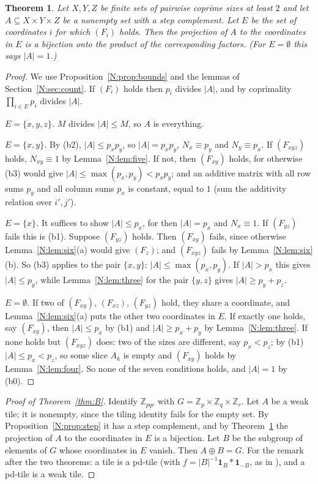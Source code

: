\documentclass[11pt,a4paper]{amsart}
\newtheorem{theorem}{Theorem}
\theoremstyle{definition}
\theoremstyle{remark}
\newcommand{\Z}{\mathbb{Z}}
\newcommand{\one}{\mathbf{1}}
\begin{document}
\begin{theorem}\label{N:thm:structure}
Let $X,Y,Z$ be finite sets of pairwise coprime sizes at least $2$ and let $A\subseteq X\times Y\times Z$ be a
nonempty set with a step complement. Let $E$ be the set of coordinates $i$ for which $(F_i)$ holds. Then the
projection of $A$ to the coordinates in $E$ is a bijection onto the product of the corresponding factors. (For
$E=\emptyset$ this says $|A|=1$.)
\end{theorem}
\begin{proof}
We use Proposition~\ref{N:prop:bounds} and the lemmas of Section~\ref{N:sec:count}. If $(F_i)$ holds then $p_i$
divides $|A|$, and by coprimality $\prod_{i\in E}p_i$ divides $|A|$.

\emph{$E=\{x,y,z\}$.} $M$ divides $|A|\le M$, so $A$ is everything.

\emph{$E=\{x,y\}$.} By (b2), $|A|\le p_xp_y$, so $|A|=p_xp_y$, $N_x\equiv p_y$ and $N_y\equiv p_x$. If $(F_{xyz})$
holds, $N_{xy}\equiv1$ by Lemma~\ref{N:lem:five}. If not, then $(F_{xy})$ holds, for otherwise (b3) would give
$|A|\le\max(p_x,p_y)<p_xp_y$; and an additive matrix with all row sums $p_y$ and all column sums $p_x$ is
constant, equal to $1$ (sum the additivity relation over $i',j'$).

\emph{$E=\{x\}$.} It suffices to show $|A|\le p_x$, for then $|A|=p_x$ and $N_x\equiv 1$. If $(F_{yz})$ fails this
is (b1). Suppose $(F_{yz})$ holds. Then $(F_{xy})$ fails, since otherwise Lemma~\ref{N:lem:six}(a) would give
$(F_z)$; and $(F_{xyz})$ fails by Lemma~\ref{N:lem:six}(b). So (b3) applies to the pair $\{x,y\}$:
$|A|\le\max(p_x,p_y)$. If $|A|>p_x$ this gives $|A|\le p_y$, while Lemma~\ref{N:lem:three} for the pair $\{y,z\}$
gives $|A|\ge p_y+p_z$.

\emph{$E=\emptyset$.} If two of $(F_{xy})$, $(F_{xz})$, $(F_{yz})$ hold, they share a coordinate, and
Lemma~\ref{N:lem:six}(a) puts the other two coordinates in $E$. If exactly one holds, say $(F_{xy})$, then
$|A|\le p_x$ by (b1) and $|A|\ge p_x+p_y$ by Lemma~\ref{N:lem:three}. If none holds but $(F_{xyz})$ does: two of
the sizes are different, say $p_x<p_z$; by (b1) $|A|\le p_x<p_z$, so some slice $A_k$ is empty and $(F_{xy})$
holds by Lemma~\ref{N:lem:four}. So none of the seven conditions holds, and $|A|=1$ by (b0).
\end{proof}

\begin{proof}[Proof of Theorem~\ref{thm:B}]
Identify $\Z_{pqr}$ with $G=\Z_p\times\Z_q\times\Z_r$. Let $A$ be a weak tile; it is nonempty, since the
tiling identity fails for the empty set. By Proposition~\ref{N:prop:step} it has a step complement, and by
Theorem~\ref{N:thm:structure} the projection of $A$ to the coordinates in $E$ is a bijection. Let $B$ be the
subgroup of elements of $G$ whose coordinates in $E$ vanish. Then $A\oplus B=G$. For the remark after the two
theorems: a tile is a pd-tile (with $f=|B|^{-1}\one_B*\one_{-B}$, as in \cite{KMMS,KLMS}), and a pd-tile is a weak
tile.
\end{proof}
\end{document}
